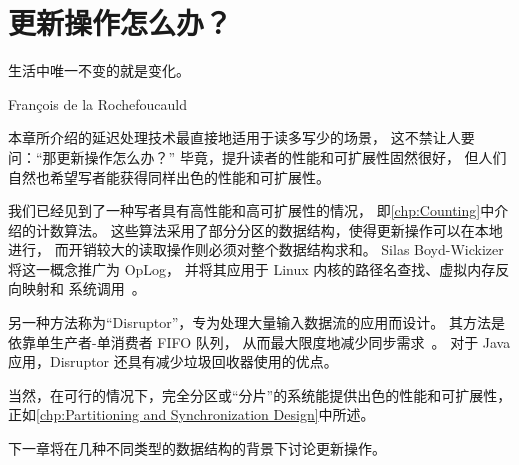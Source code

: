 
\section{更新操作怎么办？}
\label{sec:defer:What About Updates?}
%
\epigraph{生活中唯一不变的就是变化。}
	 {Fran\c{c}ois de la Rochefoucauld}

本章所介绍的延迟处理技术最直接地适用于读多写少的场景，
这不禁让人要问：``那更新操作怎么办？''
毕竟，提升读者的性能和可扩展性固然很好，
但人们自然也希望写者能获得同样出色的性能和可扩展性。

我们已经见到了一种写者具有高性能和高可扩展性的情况，
即\cref{chp:Counting}中介绍的计数算法。
这些算法采用了部分分区的数据结构，使得更新操作可以在本地进行，
而开销较大的读取操作则必须对整个数据结构求和。
Silas Boyd-Wickizer 将这一概念推广为 OpLog，
并将其应用于 Linux 内核的路径名查找、虚拟内存反向映射和
 系统调用~\cite{SilasBoydWickizerPhD}。

另一种方法称为``Disruptor''，专为处理大量输入数据流的应用而设计。
其方法是依靠单生产者-单消费者 FIFO 队列，
从而最大限度地减少同步需求~\cite{AdrianSutton2013LCA:Disruptor}。
对于 Java 应用，Disruptor 还具有减少垃圾回收器使用的优点。

当然，在可行的情况下，完全分区或``分片''的系统能提供出色的性能和可扩展性，
正如\cref{chp:Partitioning and Synchronization Design}中所述。

下一章将在几种不同类型的数据结构的背景下讨论更新操作。
